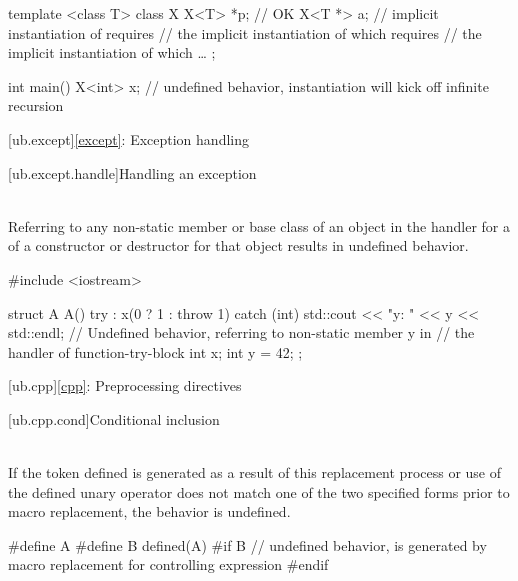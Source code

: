 \pnum
\begin{example}
\begin{codeblock}
template <class T>
class X {
  X<T> *p;      // OK
  X<T *> a;     // implicit instantiation of  requires
                // the implicit instantiation of  which requires
                // the implicit instantiation of  which \ldots
};

int main() {
  X<int> x;     // undefined behavior, instantiation will kick off infinite recursion
}
\end{codeblock}
\end{example}


[ub.except]{\ref{except}: Exception handling}

[ub.except.handle]{Handling an exception}

\pnum
{} \\
Referring to any non-static member or base class of an object in the handler for a   of a
constructor or destructor for that object results in undefined behavior.

\pnum
\begin{example}
\begin{codeblock}
#include <iostream>

struct A {
  A() try : x(0 ? 1 : throw 1) {
  } catch (int) {
    std::cout << "y: " << y << std::endl;   // Undefined behavior, referring to non-static member y in
                                            // the handler of function-try-block
  }
  int x;
  int y = 42;
};
\end{codeblock}
\end{example}


[ub.cpp]{\ref{cpp}: Preprocessing directives}

[ub.cpp.cond]{Conditional inclusion}

\pnum
{} \\
If the token defined is generated as a result of this replacement process or use of
the defined unary operator does not match one of the two specified forms prior to macro replacement, the
behavior is undefined.

\pnum
\begin{example}
\begin{codeblock}
#define A
#define B defined(A)
#if B                   // undefined behavior,  is generated by macro replacement for controlling expression
#endif
\end{codeblock}
\end{example}


